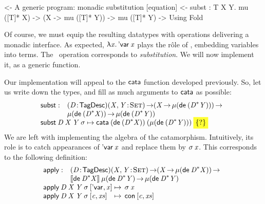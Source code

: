 \begin{wstructure}
<- A generic program: monadic substitution [equation]
    <- subst : \forall T X Y. mu ([T]* X) -> (X -> mu ([T]* Y)) -> mu ([T]* Y)
        -> Using Fold
\end{wstructure}

Of course, we must equip the resulting datatypes with operations
delivering a monadic interface. As expected, \(\LAM{\x}\DVar{\x}\)
plays the r\^ole of \return, embedding variables into terms. The
\bind\ operation corresponds to \emph{substitution}. We will now
implement it, as a generic function.


\newcommand{\subst}{\F{subst}}
\newcommand{\apply}{\F{apply}}

Our implementation will appeal to the $\cata$ function developed
previously. So, let us write down the types, and fill as much
arguments to $\cata$ as possible:
%
\[\stk{
\begin{array}{@{}ll}
\subst : & \PITEL{\V{D}}{\TagDesc}
           \PI{\V{X}, \V{Y}}{\Set} 
           (\V{X} \To \Mu{(\toDesc{(\FreeMonad{\V{D}}{\V{Y}})})}) \To \\
         & \Mu{(\toDesc{(\FreeMonad{\V{D}}{\V{X}})})} \To
           \Mu{(\toDesc{(\FreeMonad{\V{D}}{\V{Y}})})} 
\end{array} \\
\subst\: \V{D}\: \V{X}\: \V{Y}\: \V{\sigma} \mapsto
  \cata\: (\toDesc{(\FreeMonad{\V{D}}{\V{X}})})\: 
          (\Mu{(\toDesc{(\FreeMonad{\V{D}}{\V{Y}})})})\: 
          \SHED
}\]
%
We are left with implementing the algebra of the
catamorphism. Intuitively, its role is to catch appearances of
$\DVar{\V{x}}$ and replace them by $\V{\sigma}\: \V{x}$. This
corresponds to the following definition:
%
\[\stk{
\begin{array}{@{}ll}
\apply : & \PITEL{\V{D}}{\TagDesc} 
           \PI{\V{X}, \V{Y}}{\Set} 
           (\V{X} \To \Mu{(\toDesc{\FreeMonad{\V{D}}{\V{X}}})}) \To \\
         & \descop{\toDesc{\FreeMonad{\V{D}}{\V{X}}}}{\Mu{(\toDesc{\FreeMonad{\V{D}}{\V{Y}}})}} \To
           \Mu{(\toDesc{\FreeMonad{\V{D}}{\V{Y}}})}
\\
\end{array} \\
\begin{array}{@{}l@{\:\mapsto\:\:}l}
\apply\: \V{D}\: \V{X}\: \V{Y}\: \V{\sigma}\: \pair{\DVar{\!}}{\V{x}}{}   & \V{\sigma}\: \V{x}                   \\
\apply\: \V{D}\: \V{X}\: \V{Y}\: \V{\sigma}\: \pair{\V{c}}{\V{xs}}{} & \Con{\pair{\V{c}}{\V{xs}}{}}
\end{array}
}\]


